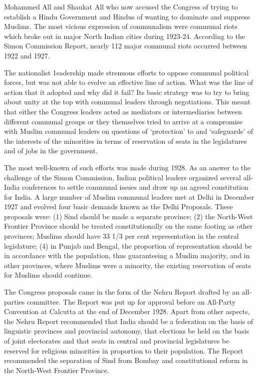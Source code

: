Mohammed All and Shaukat All who now accused the Congress of trying to establish a Hindu Government and Hindus of wanting to dominate and suppress Muslims. The most vicious expression of communalism were communal riots which broke out in major North Indian cities during 1923-24. According to the Simon Commission Report, nearly 112 major communal riots occurred between 1922 and 1927. 

The nationalist 1eadership made strenuous efforts to oppose communal political forces, but was not able to evolve an effective line of action. What was the line of action that it adopted and why did it fail? Its basic strategy was to try to bring about unity at the top with communal leaders through negotiations. This meant that either the Congress leaders acted as mediators or intermediaries between different communal groups or they themselves tried to arrive at a compromise with Muslim communal leaders on questions of ‘protection’ to and ‘safeguards’ of the interests of the minorities in terms of reservation of seats in the legislatures and of jobs in the government. 

The most well-known of such efforts was made during 1928. As an answer to the challenge of the Simon Commission, Indian political leaders organized several all-India conferences to settle communal issues and draw up an agreed constitution for India. A large number of Muslim communal leaders met at Delhi in December 1927 and evolved four basic demands known as the Delhi Proposals. These proposals were: (1) Sind should be made a separate province; (2) the North-West Frontier Province should be treated constitutionally on the same footing as other provinces; Muslims should have 33 1/3 per cent representation in the central legislature; (4) in Punjab and Bengal, the proportion of representation should be in accordance with the population, thus guaranteeing a Muslim majority, and in other provinces, where Muslims were a minority, the existing reservation of seats for Muslims should continue. 

The Congress proposals came in the form of the Nehru Report drafted by an all-parties committee. The Report was put up for approval before an All-Party Convention at Calcutta at the end of December 1928. Apart from other aspects, the Nehru Report recommended that India should be a federation on the basis of linguistic provinces and provincial autonomy, that elections be held on the basis of joint electorates and that seats in central and provincial legislatures be reserved for religious minorities in proportion to their population. The Report recommended the separation of Sind from Bombay and constitutional reform in the North-West Frontier Province. 

